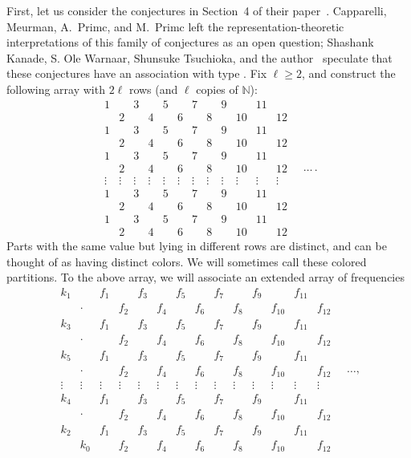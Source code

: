 \documentclass[10pt,a4paper]{amsart}
\numberwithin{equation}{section}
\theoremstyle{definition}
\newcommand{\NN}{\mathbb{N}}
\begin{document}
First, let us consider the conjectures in Section~4 of their paper~\cite{CMPP}. Capparelli, Meurman, A.~Primc, and M.~Primc left the representation-theoretic interpretations of this family of conjectures as an open question; Shashank Kanade, S. Ole Warnaar, Shunsuke Tsuchioka, and the author~\cite{KRTW} speculate that these conjectures have an association with type . Fix $\ell\ge 2$, and construct the following array with $2\ell$ rows (and $\ell$ copies of $\NN$):
\begin{equation*}
\begin{matrix}
1 && 3 && 5 && 7 && 9 && 11 & \\
& 2 && 4 && 6 && 8 && 10 && 12\\
1 && 3 && 5 && 7 && 9 && 11 & \\
& 2 && 4 && 6 && 8 && 10 && 12\\
1 && 3 && 5 && 7 && 9 && 11 & \\
& 2 && 4 && 6 && 8 && 10 && 12\\
\vdots & \vdots &\vdots& \vdots &\vdots& \vdots &\vdots& \vdots &\vdots& \vdots &\vdots& \vdots\\
1 && 3 && 5 && 7 && 9 && 11 & \\
& 2 && 4 && 6 && 8 && 10 && 12\\
1 && 3 && 5 && 7 && 9 && 11 & \\
& 2 && 4 && 6 && 8 && 10 && 12
 \end{matrix}\quad\dots\,.
\end{equation*}
Parts with the same value but lying in different rows are distinct, and can be thought of as having distinct colors. We will sometimes call these colored partitions.
To the above array, we will associate an extended array of frequencies
\begin{equation*}
\begin{matrix}
k_1 && f_1 && f_3 && f_5 && f_7 && f_9 && f_{11} & \\
& \cdot && f_2 && f_4 && f_6 && f_8 && f_{10} && f_{12}\\
k_3 &&f_1 && f_3 && f_5 && f_7 && f_9 && f_{11} & \\
& \cdot && f_2 && f_4 && f_6 && f_8 && f_{10} && f_{12}\\
k_5 &&f_1 && f_3 && f_5 && f_7 && f_9 && f_{11} & \\
& \cdot && f_2 && f_4 && f_6 && f_8 && f_{10} && f_{12}\\
\vdots & \vdots &\vdots& \vdots &\vdots& \vdots &\vdots& \vdots &\vdots& \vdots &\vdots& \vdots&\vdots& \vdots\\
k_4 && f_1 && f_3 && f_5 && f_7 && f_9 && f_{11} & \\
& \cdot && f_2 && f_4 && f_6 && f_8 && f_{10} && f_{12} \\
k_2 && f_1 && f_3 && f_5 && f_7 && f_9 && f_{11} & \\
& k_0 && f_2 && f_4 && f_6 && f_8 && f_{10} && f_{12}
 \end{matrix}\quad\dots,
\end{equation*}
\end{document}
